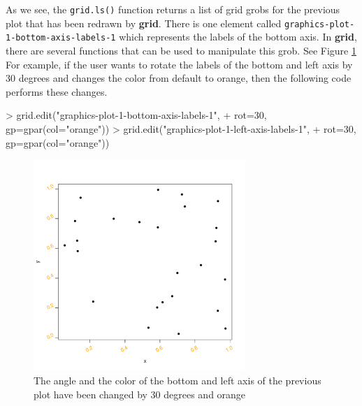 \documentclass{report}
\begin{document}
As we see, the \texttt{grid.ls()} function returns a list of grid grobs for the previous plot that has been redrawn by \textbf{grid}. There is one element called \texttt{graphics-plot-1-bottom-axis-labels-1} which represents the labels of the bottom axis. In \textbf{grid}, there are several functions that can be used to manipulate this grob. See Figure \ref{figure_1.2} \\

For example, if the user wants to rotate the labels of the bottom and left axis by 30 degrees and changes the color from default to orange, then the following code performs these changes.
\begin{Schunk}
\begin{Sinput}
> grid.edit("graphics-plot-1-bottom-axis-labels-1", 
+           rot=30, gp=gpar(col="orange"))
> grid.edit("graphics-plot-1-left-axis-labels-1", 
+           rot=30, gp=gpar(col="orange"))
\end{Sinput}
\end{Schunk}

\begin{figure}[h]
	\begin{center}
		\includegraphics[height = 8cm, width = 8cm]{figure/report_basic_demo_4.pdf}
		\caption{The angle and the color of the bottom and left axis of the previous plot have been changed by 30 degrees and orange}
		\label{figure_1.2}
	\end{center}
\end{figure}
\end{document}
